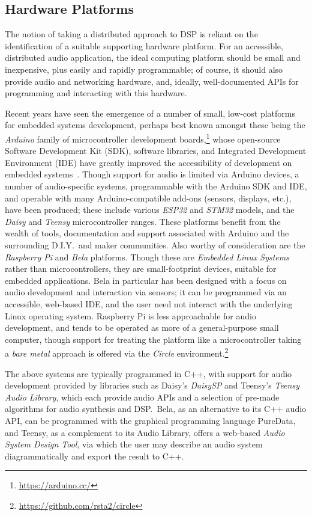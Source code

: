 \subsection{Hardware Platforms}\label{subsec:hardware-platforms}

The notion of taking a distributed approach to DSP is reliant on the
identification of a suitable supporting hardware platform.
For an accessible, distributed audio application, the ideal computing platform
should be small and inexpensive, plus easily and rapidly programmable;
of course, it should also provide audio and networking hardware, and, ideally,
well-documented APIs for programming and interacting with this hardware.

Recent years have seen the emergence of a number of small, low-cost platforms
for embedded systems development, perhaps best known amongst these being the
\textit{Arduino} family of microcontroller development boards,\footnote{
    \url{https://arduino.cc/}
}
whose open-source Software Development Kit (SDK), software libraries, and
Integrated Development Environment (IDE) have greatly improved the
accessibility of development on embedded systems~\citep{michon_embedded_2020}.
Though support for audio is limited via Arduino devices, a number of
audio-specific systems, programmable with the Arduino SDK and IDE, and
operable with many Arduino-compatible add-ons (sensors, displays, etc.), have
been produced;
these include various \textit{ESP32} and \textit{STM32} models, and the
\textit{Daisy} and \textit{Teensy} microcontroller ranges.
These platforms benefit from the wealth of tools, documentation and support
associated with Arduino and the surrounding D.I.Y.\ and maker communities.
Also worthy of consideration are the \textit{Raspberry Pi} and \textit{Bela}
platforms.
Though these are \textit{Embedded Linux Systems} rather than microcontrollers,
they are small-footprint devices, suitable for embedded applications.
Bela in particular has been designed with a focus on audio development and
interaction via sensors; it can be programmed via an accessible, web-based IDE,
and the user need not interact with the underlying Linux operating system.
Raspberry Pi is less approachable for audio development, and tends to be
operated as more of a general-purpose small computer, though support for
treating the platform like a microcontroller \textemdash{} taking a
\textit{bare metal} approach \textemdash{} is offered via the \textit{Circle}
environment.\footnote{\url{https://github.com/rsta2/circle}}

The above systems are typically programmed in C++, with support for audio
development provided by libraries such as Daisy's \textit{DaisySP} and Teensy's
\textit{Teensy Audio Library}, which each provide audio APIs and a selection of
pre-made algorithms for audio synthesis and DSP.\
Bela, as an alternative to its C++ audio API, can be programmed with the
graphical programming language PureData, and Teensy, as a complement to its
Audio Library, offers a web-based \textit{Audio System Design Tool}, via which
the user may describe an audio system diagrammatically and export the result to
C++.

